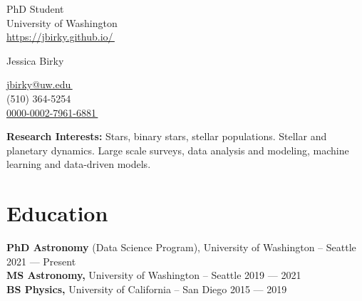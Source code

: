 \documentclass[a4,10.5pt]{article}
\let\orighref\href
\renewcommand{\href}[2]{\orighref{#1}{#2\,\scriptsize\faExternalLink}}
\begin{document}
\begin{center}
    \begin{minipage}[b]{0.24\textwidth}
            \flushleft  
            PhD Student \\
            University of Washington \\
            {\href{https://jbirky.github.io/}{https://jbirky.github.io/} } \\
    \end{minipage}   
    \begin{minipage}[b]{0.5\textwidth}
            \centering
            {\Huge Jessica Birky} \\ %
            \vspace{0.1cm}
    \end{minipage}%
    \begin{minipage}[b]{0.24\textwidth}
            \flushright
            \href{mailto:jbirky@uw.edu}{jbirky@uw.edu} \\
            (510) 364-5254 \\
            \href{https://orcid.org/0000-0002-7961-6881}{0000-0002-7961-6881}
    \end{minipage}%
    
\vspace{-0.15cm} 
{\color{UI_blue} \hrulefill}
\end{center}
\textbf{Research Interests:} Stars, binary stars, stellar populations. Stellar and planetary dynamics. Large scale surveys, data analysis and modeling, machine learning and data-driven models. 
\vspace{-0.2cm}


\section{Education }
\textbf{PhD Astronomy} (Data Science Program), University of Washington -- Seattle \hfill 2021 --- Present \\ 
\vspace{0.1cm}
\textbf{MS Astronomy,} University of Washington -- Seattle \hfill 2019 --- 2021 \\
\vspace{0.1cm}
\textbf{BS Physics,} University of California -- San Diego \hfill 2015 --- 2019
\end{document}
